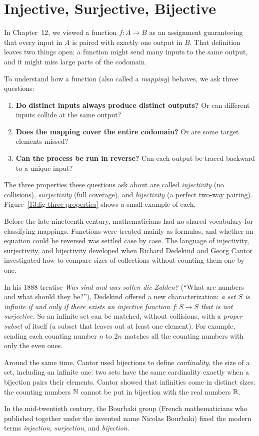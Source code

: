 \section{Injective, Surjective, Bijective}
\chapterline

In Chapter~12, we viewed a function $f: A \to B$ as an assignment guaranteeing that every input in $A$ is paired with exactly one output in $B$. That definition leaves two things open: a function might send many inputs to the same output, and it might miss large parts of the codomain.

To understand how a function (also called a \emph{mapping}) behaves, we ask three questions:
\begin{enumerate}[label=\arabic*.]
\item \textbf{Do distinct inputs always produce distinct outputs?} Or can different inputs collide at the same output?
\item \textbf{Does the mapping cover the entire codomain?} Or are some target elements missed?
\item \textbf{Can the process be run in reverse?} Can each output be traced backward to a unique input?
\end{enumerate}

The three properties these questions ask about are called \emph{injectivity} (no collisions), \emph{surjectivity} (full coverage), and \emph{bijectivity} (a perfect two-way pairing). Figure~\ref{13:fig-three-properties} shows a small example of each.

\begin{historybox}
Before the late nineteenth century, mathematicians had no shared vocabulary for classifying mappings. Functions were treated mainly as formulas, and whether an equation could be reversed was settled case by case. The language of injectivity, surjectivity, and bijectivity developed when Richard Dedekind and Georg Cantor investigated how to compare sizes of collections without counting them one by one.

In his 1888 treatise \emph{Was sind und was sollen die Zahlen?} (``What are numbers and what should they be?''), Dedekind offered a new characterization: \emph{a set $S$ is infinite if and only if there exists an injective function $f: S \to S$ that is not surjective.} So an infinite set can be matched, without collisions, with a \emph{proper subset} of itself (a subset that leaves out at least one element). For example, sending each counting number $n$ to $2n$ matches all the counting numbers with only the even ones.

Around the same time, Cantor used bijections to define \emph{cardinality}, the size of a set, including an infinite one: two sets have the same cardinality exactly when a bijection pairs their elements. Cantor showed that infinities come in distinct sizes: the counting numbers $\mathbb{N}$ cannot be put in bijection with the real numbers $\mathbb{R}$.

In the mid-twentieth century, the Bourbaki group (French mathematicians who published together under the invented name Nicolas Bourbaki) fixed the modern terms \emph{injection}, \emph{surjection}, and \emph{bijection}.
\end{historybox}

